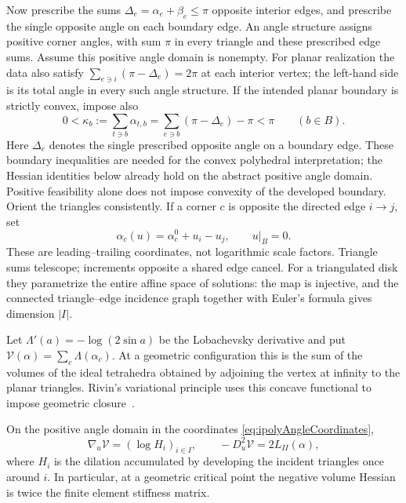 Now prescribe the sums $\Delta_e=\alpha_e+\beta_e\le\pi$ opposite
interior edges, and prescribe the single opposite angle on each
boundary edge. An angle structure assigns positive corner angles,
with sum $\pi$ in every triangle and these prescribed edge sums.
Assume this positive angle domain is nonempty. For planar realization
the data also satisfy
$\sum_{e\ni i}(\pi-\Delta_e)=2\pi$ at each interior vertex; the
left-hand side is its total angle in every such angle structure.
If the intended planar boundary is strictly convex, impose also
\[
 0<\kappa_b:=\sum_{t\ni b}\alpha_{t,b}
   =\sum_{e\ni b}(\pi-\Delta_e)-\pi<\pi
 \qquad(b\in B).
\]
Here $\Delta_e$ denotes the single prescribed opposite angle on a
boundary edge. These boundary inequalities are needed for the convex
polyhedral interpretation; the Hessian identities below already hold
on the abstract positive angle domain. Positive feasibility alone
does not impose convexity of the developed boundary.
Orient the triangles consistently. If a corner $c$ is opposite the
directed edge $i\to j$, set
\begin{equation}
 \alpha_c(u)=\alpha_c^0+u_i-u_j,\qquad u|_B=0.
 \label{eq:ipolyAngleCoordinates}
\end{equation}
These are leading--trailing coordinates, not logarithmic scale factors.
Triangle sums telescope; increments opposite a shared edge cancel.
For a triangulated disk they parametrize the entire affine space of
solutions: the map is injective, and the connected triangle--edge
incidence graph together with Euler's formula gives dimension $|I|$.

Let $\Lambda'(a)=-\log(2\sin a)$ be the Lobachevsky derivative and put
$\mathcal V(\alpha)=\sum_c\Lambda(\alpha_c)$. At a geometric
configuration this is the sum of the volumes of the ideal tetrahedra
obtained by adjoining the vertex at infinity to the planar triangles.
Rivin's variational principle uses this concave functional to impose
geometric closure~\cite{RivinEuclidean,FuterGueritaud}.

\begin{proposition}
\label{prop:ipolyHessian}
On the positive angle domain in the coordinates
\eqref{eq:ipolyAngleCoordinates},
\begin{equation}
 \nabla_u\mathcal V=(\log H_i)_{i\in I},\qquad
 -D_u^2\mathcal V=2L_{II}(\alpha),
 \label{eq:ipolyHessian}
\end{equation}
where $H_i$ is the dilation accumulated by developing the incident
triangles once around $i$. In particular, at a geometric critical point
the negative volume Hessian is twice the finite element stiffness matrix.
\end{proposition}

